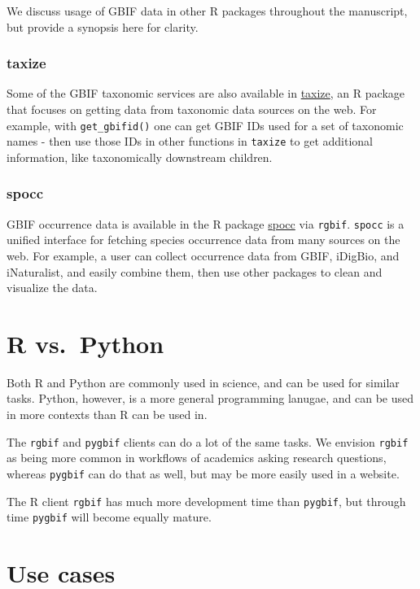 \documentclass[author-year, review, 11pt]{components/elsarticle} %
\begin{document}
We discuss usage of GBIF data in other R packages throughout the
manuscript, but provide a synopsis here for clarity.

\subsubsection{taxize}\label{taxize}

Some of the GBIF taxonomic services are also available in
\href{https://github.com/ropensci/taxize}{taxize}, an R package that
focuses on getting data from taxonomic data sources on the web. For
example, with \texttt{get\_gbifid()} one can get GBIF IDs used for a set
of taxonomic names - then use those IDs in other functions in
\texttt{taxize} to get additional information, like taxonomically
downstream children.

\subsubsection{spocc}\label{spocc}

GBIF occurrence data is available in the R package
\href{https://github.com/ropensci/spocc}{spocc} via \texttt{rgbif}.
\texttt{spocc} is a unified interface for fetching species occurrence
data from many sources on the web. For example, a user can collect
occurrence data from GBIF, iDigBio, and iNaturalist, and easily combine
them, then use other packages to clean and visualize the data.

\section{R vs.~Python}\label{r-vs.python}

Both R and Python are commonly used in science, and can be used for
similar tasks. Python, however, is a more general programming lanugae,
and can be used in more contexts than R can be used in.

The \texttt{rgbif} and \texttt{pygbif} clients can do a lot of the same
tasks. We envision \texttt{rgbif} as being more common in workflows of
academics asking research questions, whereas \texttt{pygbif} can do that
as well, but may be more easily used in a website.

The R client \texttt{rgbif} has much more development time than
\texttt{pygbif}, but through time \texttt{pygbif} will become equally
mature.

\section{Use cases}\label{use-cases}
\end{document}
